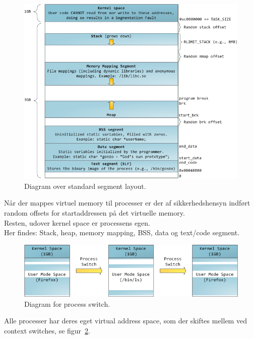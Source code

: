 \begin{figure}[H]
	\centering
	\includegraphics[width=\linewidth]{figs/spm1/memorydiagram}
	\caption{Diagram over standard segment layout.}
	\label{fig:memorydiagram}
\end{figure}

Når der mappes virtuel memory til processer er der af sikkerhedshensyn indført random offsets for startaddressen på det virtuelle memory.\\

Resten, udover kernel space er processens egen.\\

Her findes: Stack, heap, memory mapping, BSS, data og text/code segment.

\begin{figure}[h]
	\centering
	\includegraphics[width=\linewidth]{figs/spm1/memoryspace}
	\caption{Diagram for process switch.}
	\label{fig:memoryspace}
\end{figure}

Alle processer har deres eget virtual address space, som der skiftes mellem ved context switches, se figur~\ref{fig:memoryspace}.


